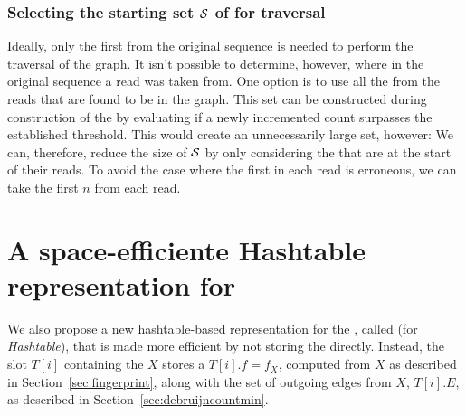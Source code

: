\subsubsection{Selecting the starting set $\strsetname{S}$ of  for traversal}

Ideally, only the first \kmer from the original sequence is  needed to perform the traversal of the graph. It isn't possible to determine, however, where in the original sequence a read was taken from. One option is to use all the  from the reads that are found to be in the graph. This set can be constructed during construction of the \dBCM by evaluating if a newly incremented  count surpasses the established threshold. This would create an unnecessarily large set, however:  We can, therefore, reduce the size of $\strsetname{S}$ by only considering the  that are at the start of their reads. To avoid the case where the first \kmer in each read is erroneous, we can take the first $n$  from each read. 

\section{A space-efficiente Hashtable representation for }
\label{sec:debruijnhashtable}

We also propose a new hashtable-based representation for the \dBG, called \dBHT (for \emph{\dB Hashtable}), that is made more efficient by not storing the \kmer directly. Instead, the slot $T[i]$ containing the \kmer $X$ stores a  $T[i].f = f_X$, computed from $X$ as described in Section~\ref{sec:fingerprint}, along with the set of outgoing edges from $X$, $T[i].E$,  as described in Section~\ref{sec:debruijncountmin}.

